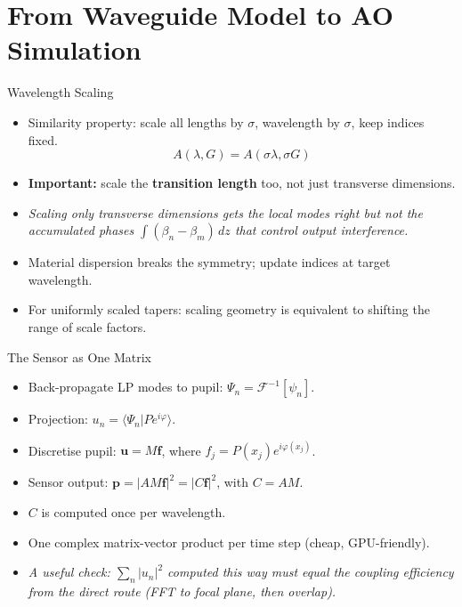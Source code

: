 \documentclass[aspectratio=169,10pt]{beamer}
\begin{document}
\section{From Waveguide Model to AO Simulation}
\begin{frame}{Wavelength Scaling}
\begin{itemize}
    \item Similarity property: scale all lengths by \(\sigma\), wavelength by \(\sigma\), keep indices fixed.
    \[
        A(\lambda, G) = A(\sigma \lambda, \sigma G)
    \]
    \item \textbf{Important:} scale the \textbf{transition length} too, not just transverse dimensions.
    \item \emph{Scaling only transverse dimensions gets the local modes right but not the accumulated phases $\int (\beta_n - \beta_m)\,dz$ that control output interference.}
    \item Material dispersion breaks the symmetry; update indices at target wavelength.
    \item For uniformly scaled tapers: scaling geometry is equivalent to shifting the range of scale factors.
\end{itemize}
\end{frame}

\begin{frame}{The Sensor as One Matrix}
\begin{itemize}
    \item Back-propagate LP modes to pupil: \(\Psi_n = \mathcal{F}^{-1}[\psi_n]\).
    \item Projection: \(u_n = \langle \Psi_n | P e^{i\varphi} \rangle\).
    \item Discretise pupil: \(\mathbf{u} = M \mathbf{f}\), where \(f_j = P(x_j) e^{i\varphi(x_j)}\).
    \item Sensor output: \(\mathbf{p} = |A M \mathbf{f}|^2 = |C \mathbf{f}|^2\), with \(C = A M\).
    \item \(C\) is computed once per wavelength.
    \item One complex matrix-vector product per time step (cheap, GPU-friendly).
    \item \emph{A useful check: \(\sum_n |u_n|^2\) computed this way must equal the coupling efficiency from the direct route (FFT to focal plane, then overlap).}
\end{itemize}
\end{frame}
\end{document}
